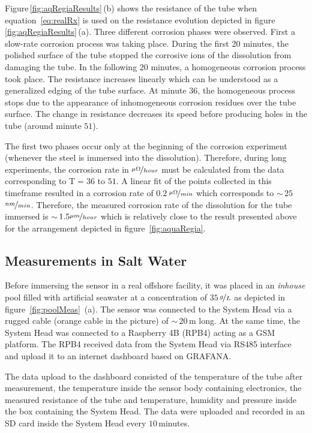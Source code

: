 \documentclass[journal,twoside,web]{ieeecolor}
\begin{document}
Figure\,\ref{fig:aqRegiaResults}\,(b) shows the resistance of the tube when equation~\ref{eq:realRx} is used on the resistance evolution depicted in figure\,\ref{fig:aqRegiaResults}\,(a). Three different corrosion phases were observed. First a slow-rate corrosion process was taking place. During the first 20 minutes, the polished surface of the tube stopped the corrosive ions of the dissolution from damaging the tube. In the following 20 minutes, a homogeneous corrosion process took place. The resistance increases linearly which can be understood as a generalized edging of the tube surface. At minute 36, the homogeneous process stops due to the appearance of inhomogeneous corrosion residues over the tube surface. The change in resistance decreases its speed before producing holes in the tube (around minute $51$).

The first two phases occur only at the beginning of the corrosion experiment (whenever the steel is immersed into the dissolution). Therefore, during long experiments, the corrosion rate in $\nicefrac{\mu\Omega}{hour}$ must be calculated from the data corresponding to T$=36$ to $51$. A linear fit of the points collected in this timeframe resulted in a corrosion rate of $0.2$\,$\nicefrac{\mu\Omega}{min}$ which corresponds to $\sim$\,$25$\,$\nicefrac{nm}{min}$. Therefore, the measured corrosion rate of the dissolution for the tube immersed is $\sim$\,$1.5\nicefrac{\mu m}{hour}$ which is relatively close to the result presented above for the arrangement depicted in figure~\ref{fig:aquaRegia}.
\subsection{Measurements in Salt Water}
\label{ssec:measSaltWat}
Before immersing the sensor in a real offshore facility, it was placed in an \textit{inhouse} pool filled with artificial seawater at a concentration of $35$\,$\nicefrac{g}{L}$ as depicted in figure~\ref{fig:poolMeas}~(a). The sensor was connected to the System Head via a rugged cable (orange cable in the picture) of $\sim$\,$20$\,m long. At the same time, the System Head was connected to a Raspberry 4B (RPB4) acting as a GSM platform. The RPB4 received data from the System Head via RS485 interface and upload it to an internet dashboard based on GRAFANA.

The data upload to the dashboard consisted of the temperature of the tube after measurement, the temperature inside the sensor body containing electronics, the measured resistance of the tube and temperature, humidity and pressure inside the box containing the System Head. The data were uploaded and recorded in an SD card inside the System Head every $10$\,minutes.
\end{document}
